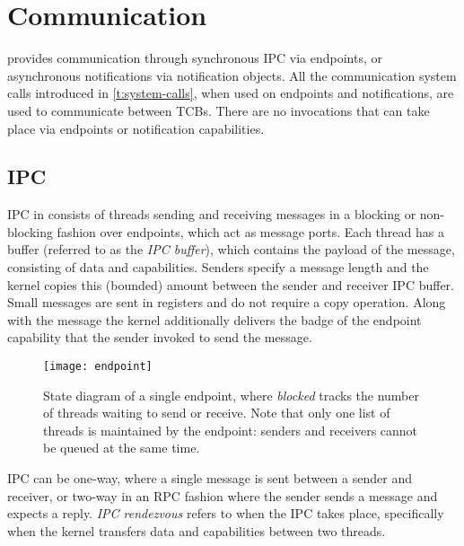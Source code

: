 \section{Communication}

\selfour provides communication through synchronous IPC via endpoints, or asynchronous notifications
via notification objects. All the communication system calls introduced in \cref{t:system-calls},
when used on endpoints and notifications, are used to communicate between TCBs. There are no
invocations that can take place via endpoints or notification capabilities. 

\subsection{IPC}
\label{p:sel4_ipc}

IPC in \selfour consists of threads sending and receiving messages in a blocking or non-blocking
fashion over endpoints, which act as
message ports. Each thread has a buffer (referred to as the \emph{IPC buffer}), which contains the payload of the message, consisting
of data and capabilities. Senders specify a message length and the kernel copies this (bounded)
amount between the sender and receiver IPC buffer. Small messages are sent in registers and do not
require a copy operation. 
Along with the message the kernel additionally delivers the badge of the endpoint capability that the sender 
invoked to send the message.

\begin{figure}[t]
    \centering
    \texttt{[image: endpoint]}
    \caption[State diagram of an endpoint.]{State diagram of a single endpoint, where \emph{blocked} tracks the number of threads
    waiting to send or receive. Note that only one list of threads is maintained by the endpoint:
senders and receivers cannot be queued at the same time.}
    \label{f:endpoint}
\end{figure}


IPC can be one-way, where a single message is sent between a sender and receiver, or two-way in an
RPC fashion where the sender sends a message and expects a reply. \emph{IPC rendezvous} refers to
when the IPC takes place, specifically when the kernel transfers data and capabilities between two
threads. 

